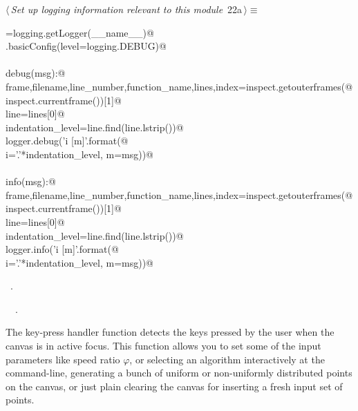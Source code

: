 \documentclass[11.5pt]{report}
\begin{document}
\begin{flushleft} \small
\begin{minipage}{\linewidth}\label{scrap15}\raggedright\small
{} $\langle\,${\itshape Set up logging information relevant to this module}\nobreak\ {\footnotesize {22a}}$\,\rangle\equiv$
\vspace{-1ex}
\begin{list}{}{} \item
\mbox{}\verb@logger=logging.getLogger(__name__)@\\
\mbox{}\verb@logging.basicConfig(level=logging.DEBUG)@\\
\mbox{}\verb@@\\
\mbox{}\verb@def debug(msg):@\\
\mbox{}\verb@    frame,filename,line_number,function_name,lines,index=inspect.getouterframes(@\\
\mbox{}\verb@        inspect.currentframe())[1]@\\
\mbox{}\verb@    line=lines[0]@\\
\mbox{}\verb@    indentation_level=line.find(line.lstrip())@\\
\mbox{}\verb@    logger.debug('{i} [{m}]'.format(@\\
\mbox{}\verb@        i='.'*indentation_level, m=msg))@\\
\mbox{}\verb@@\\
\mbox{}\verb@def info(msg):@\\
\mbox{}\verb@    frame,filename,line_number,function_name,lines,index=inspect.getouterframes(@\\
\mbox{}\verb@        inspect.currentframe())[1]@\\
\mbox{}\verb@    line=lines[0]@\\
\mbox{}\verb@    indentation_level=line.find(line.lstrip())@\\
\mbox{}\verb@    logger.info('{i} [{m}]'.format(@\\
\mbox{}\verb@        i='.'*indentation_level, m=msg))@\\
\mbox{}\verb@@{\NWsep}
\end{list}
\vspace{-1.5ex}
\footnotesize
\begin{list}{}{\setlength{\itemsep}{-\parsep}\setlength{\itemindent}{-\leftmargin}}
\item \NWtxtMacroRefIn\ .
\item \NWtxtIdentsUsed\nobreak\  \verb@logger@\nobreak\ .
\item{}
\end{list}
\end{minipage}\vspace{4ex}
\end{flushleft}
\vspace{-0.8cm}\newchunk The key-press handler function detects the keys pressed by the user when the canvas
is in active focus. This function allows you to set some of the input parameters like 
speed ratio $\varphi$, or selecting an algorithm interactively at the command-line, 
generating a bunch of uniform or non-uniformly distributed points on the canvas, 
or just plain clearing the canvas for inserting a fresh input set of points. 
\end{document}
